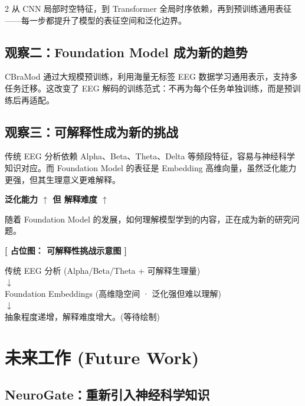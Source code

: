 \documentclass[12pt, a0paper]{article}
\renewcommand{\Large}{\fontsize{34}{42}\selectfont}
\renewcommand{\small}{\fontsize{18}{24}\selectfont}
\newcommand{\placeholder}[2]{%
    \begin{center}
    \colorbox{mygray!12}{\parbox{0.9\columnwidth}{%
        \centering
        \vspace{1.5em}
        {\Large\bfseries\color{mygray} [ 占位图： #1 ]}
        \vspace{0.8em}

        {\small\color{mygray} #2}
        \vspace{1.5em}
    }}
    \end{center}
}
\begin{document}
\begin{multicols}{2}
从 CNN 局部时空特征，到 Transformer 全局时序依赖，再到预训练通用表征——每一步都提升了模型的表征空间和泛化边界。

\subsection{观察二：Foundation Model 成为新的趋势}

CBraMod 通过大规模预训练，利用海量无标签 EEG 数据学习通用表示，支持多任务迁移。这改变了 EEG 解码的训练范式：不再为每个任务单独训练，而是预训练后再适配。

\subsection{观察三：可解释性成为新的挑战}

传统 EEG 分析依赖 Alpha、Beta、Theta、Delta 等频段特征，容易与神经科学知识对应。而 Foundation Model 的表征是 Embedding 高维向量，虽然泛化能力更强，但其生理意义更难解释。

\begin{center}
\colorbox{myorange!10}{\parbox{0.9\columnwidth}{\centering\bfseries
    泛化能力 $\uparrow$ \hspace{2em} 但 \hspace{2em} 解释难度 $\uparrow$
}}
\end{center}

随着 Foundation Model 的发展，如何理解模型学到的内容，正在成为新的研究问题。

\placeholder{可解释性挑战示意图}{%
    传统 EEG 分析 (Alpha/Beta/Theta + 可解释生理量)\\
    $\downarrow$\\
    Foundation Embeddings (高维隐空间 · 泛化强但难以理解)\\
    $\downarrow$\\
    抽象程度递增，解释难度增大。\quad (等待绘制)}

\section{未来工作 (Future Work)}

\subsection{NeuroGate：重新引入神经科学知识}


\end{multicols}
\end{document}
